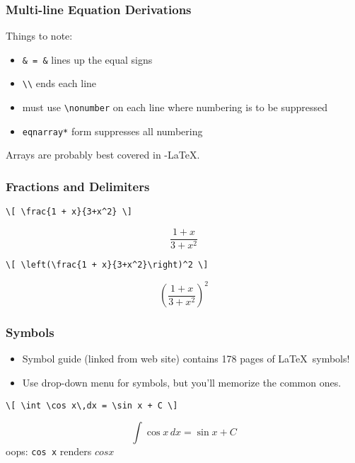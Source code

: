 \documentclass{beamer}
\begin{document}
\begin{frame}[fragile]
\frametitle{Multi-line Equation Derivations}
Things to note:
\begin{itemize}
  \item \verb+& = &+ lines up the equal signs
  \item \verb=\\= ends each line
	\item must use \verb=\nonumber= on each line where numbering is to be suppressed
	\item \verb=eqnarray*= form suppresses all numbering
\end{itemize}
Arrays are probably best covered in \AmS-\LaTeX.
\end{frame}


\begin{frame}[fragile]
\frametitle{Fractions and Delimiters}
\begin{verbatim}
\[ \frac{1 + x}{3+x^2} \]
\end{verbatim}
\[ \frac{1 + x}{3+x^2} \]
\begin{verbatim}
\[ \left(\frac{1 + x}{3+x^2}\right)^2 \]
\end{verbatim}
\[ \left(\frac{1 + x}{3+x^2}\right)^2 \]
\end{frame}


\begin{frame}[fragile]
\frametitle{Symbols}
\begin{itemize}
	\item Symbol guide (linked from web site) contains 178 pages of \LaTeX\ symbols!
	\item Use drop-down menu for symbols, but you'll memorize the common ones.
\end{itemize}
\begin{verbatim}
\[ \int \cos x\,dx = \sin x + C \]
\end{verbatim}

\[ \int \cos x\,dx = \sin x + C \]
oops:  \verb=cos x= renders $cos x$
\end{frame}
\end{document}
